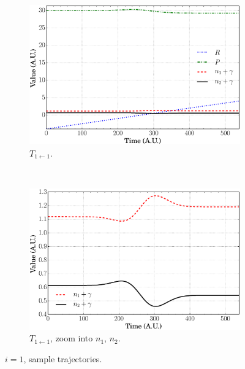 \documentclass[xetex,mathserif,serif]{beamer}
\newcommand{\too}{$ T_{1\leftarrow1} $}
\begin{document}
\begin{frame}
{\begin{figure}
\begin{subfigure}[t]{0.45\textwidth}
\includegraphics[width=\textwidth]{sc_traj_t11.eps}
\vspace{-0.1cm}
\caption{{\fontsize{7}{8}\selectfont \too.}}
\end{subfigure}
~
\begin{subfigure}[t]{0.45\textwidth}
\centering
\includegraphics[width=\textwidth]{sc_traj_t11_e.eps}
\vspace{-0.1cm}
\caption{{\fontsize{7}{8}\selectfont \too, zoom into $ n_{1}$, $n_{2} $.}}
\end{subfigure}
\vspace{-0.1cm}
\caption{$ i = 1 $, sample trajectories.}
\end{figure}
}{}


\end{frame}
\end{document}
